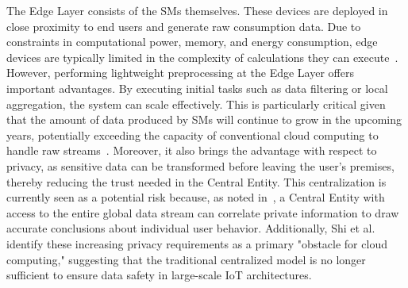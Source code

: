 The Edge Layer consists of the \acp{SM} themselves. These devices are deployed in close proximity to end users and generate raw consumption data. Due to constraints in computational power, memory, and energy consumption, edge devices are typically limited in the complexity of calculations they can execute~\cite{EdgeIntelligenceSmartMeters}.
However, performing lightweight preprocessing at the Edge Layer offers important advantages. By executing initial tasks such as data filtering or local aggregation, the system can scale effectively. This is particularly critical given that the amount of data produced by \acp{SM} will continue to grow in the upcoming years, potentially exceeding the capacity of conventional cloud computing to handle raw streams~\cite{edgecomputing}. Moreover, it also brings the advantage with respect to privacy, as sensitive data can be transformed before leaving the user's premises, thereby reducing the trust needed in the Central Entity. This centralization is currently seen as a potential risk because, as noted in~\cite{dezent2025}, a Central Entity with access to the entire global data stream can correlate private information to draw accurate conclusions about individual user behavior. Additionally, Shi et al.~\cite{edgecomputing} identify these increasing privacy requirements as a primary "obstacle for cloud computing," suggesting that the traditional centralized model is no longer sufficient to ensure data safety in large-scale IoT architectures.





